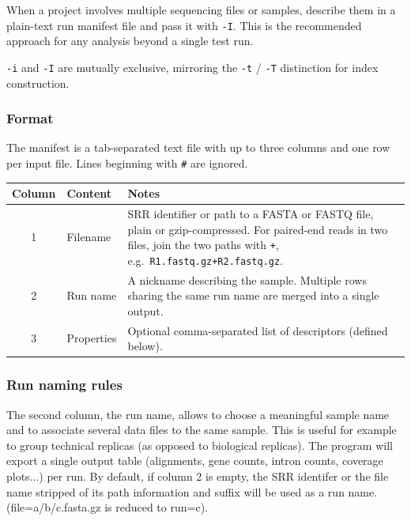 \documentclass[11pt]{article}
\newcommand{\code}[1]{\texttt{#1}}
\begin{document}
When a project involves multiple sequencing files or samples, describe
them in a plain-text run manifest file and pass it with \code{-I}.
This is the recommended approach for any analysis beyond a single test run.

\code{-i} and \code{-I} are mutually exclusive, mirroring the
\code{-t} / \code{-T} distinction for index construction.

\subsubsection{Format}

The manifest is a tab-separated text file with up to three columns and
one row per input file.  Lines beginning with \code{\#} are ignored.

\begin{center}
\begin{tabular}{clp{8.5cm}}
\toprule
\textbf{Column} & \textbf{Content} & \textbf{Notes} \\
\midrule
1 & Filename & SRR identifier or path to a FASTA or FASTQ file, plain or gzip-compressed.
               For paired-end reads in two files, join the two paths with
               \code{+}, e.g.\ \code{R1.fastq.gz+R2.fastq.gz}. \\
2 & Run name & A nickname describing the sample.
               Multiple rows sharing the same run name are merged into
               a single output. \\
3 & Properties & Optional comma-separated list of descriptors
                 (defined below). \\
\bottomrule
\end{tabular}
\end{center}

\subsubsection{Run naming rules}

The second column, the run name, allows to choose
a meaningful sample name and to associate several data files to
the same sample. This is useful for example to group technical replicas (as opposed
to biological replicas). The program will export a single output table
(alignments, gene counts, intron counts, coverage plots...) per run.
By default, if column 2 is empty, the SRR identifer
or the file name stripped of its path information and suffix will be used as a run name.
(file=a/b/c.fasta.gz  is reduced to run=c).
\end{document}

